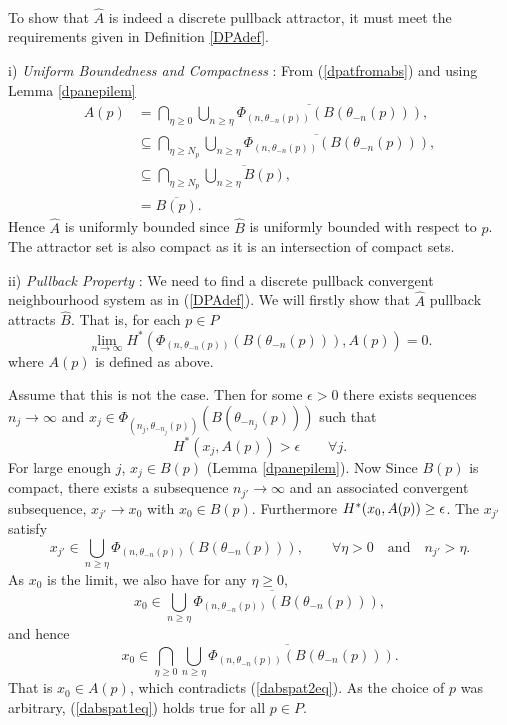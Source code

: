 \begin{prf}
  \hspace{3mm} \\
  To show that $\hat{A}$ is indeed a discrete pullback attractor, it must meet
  the requirements given in Definition \ref{DPAdef}.

  \hspace*{3mm} i) {\em Uniform Boundedness and Compactness} : From
  (\ref{dpatfromabs}) and using Lemma \ref{dpanepilem}
  \begin{align*}
  A(p) &= \bigcap_{\eta \geq 0} \overline{\bigcup_{n \geq \eta}
            \Phi_{(n,\theta_{-n}(p))}(B(\theta_{-n}(p)))}, \\
  &\subseteq \bigcap_{\eta \geq N_p} \overline{\bigcup_{n \geq \eta}
            \Phi_{(n,\theta_{-n}(p))}(B(\theta_{-n}(p)))}, \\
  &\subseteq \bigcap_{\eta \geq N_p} \overline{\bigcup_{n \geq \eta}
            B(p)}, \\
  &= \overline{B(p)}.
  \end{align*}
  Hence $\hat{A}$ is uniformly bounded since $\hat{B}$ is uniformly bounded
  with respect to $p$. The attractor set is also compact as it is an
  intersection of compact sets.

  \hspace*{3mm} ii) {\em Pullback Property} : We need to find a
  discrete pullback convergent neighbourhood system as in (\ref{DPAdef}). We
  will firstly show that $\hat{A}$ pullback attracts $\hat{B}$. That is, for
  each $p \in P$
  \begin{equation}
  \label{dabspat1eq}
    \lim_{n \to \infty} H^* (\Phi_{(n, \theta_{-n}(p))} (B(\theta_{-n}(p))),
           A(p)) = 0.
  \end{equation}
  where $A(p)$ is defined as above.

  Assume that this is not the case. Then for some $\epsilon > 0$ there exists
  sequences $n_j \to \infty$ and $x_j \in \Phi_{(n_j,
  \theta_{-n_j}(p))} (B(\theta_{-n_j}(p)))$ such that
  \begin{equation}
  \label{dabspat2eq}
    H^*(x_j,A(p)) > \epsilon \qquad \forall j.
  \end{equation}
  For large enough $j$, $x_j \in B(p)$ (Lemma \ref{dpanepilem}). Now Since
  $B(p)$ is compact, there exists a subsequence $n_{j'} \rightarrow
  \infty$ and an associated convergent subsequence, $x_{j'} \to x_0$ with
  $x_0 \in B(p)$. Furthermore $H^*(x_0, A(p)) \geq \epsilon$. The $x_{j'}$ satisfy
  \[ x_{j'} \in \bigcup_{n \geq \eta} \Phi_{(n,\theta_{-n}(p))}
          (B(\theta_{-n}(p))), \qquad \forall \eta>0 \quad \text{and}
          \quad n_{j'}>\eta. \]
  As $x_0$ is the limit, we also have for any $\eta \geq 0$,
  \[ x_0 \in \overline{\bigcup_{n \geq \eta}
         \Phi_{(n,\theta_{-n}(p))}(B(\theta_{-n}(p)))}, \]
  and hence
  \[ x_0 \in \bigcap_{\eta \geq 0} \overline{\bigcup_{n \geq \eta}
            \Phi_{(n,\theta_{-n}(p))}(B(\theta_{-n}(p)))}. \]
  That is $x_0 \in A(p)$, which contradicts (\ref{dabspat2eq}). As the
  choice of $p$ was arbitrary, (\ref{dabspat1eq}) holds true for all $p \in
  P$.


\end{prf}
